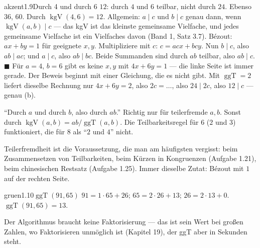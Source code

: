 \begin{loesungkarte}{akzent}{1.9}{Durch 4 und durch 6}
$12$: durch $4$ und $6$ teilbar, nicht durch $24$. Ebenso $36$, $60$.
Durch $\operatorname{kgV}(4, 6) = 12$. Allgemein: $a\mid c$ und $b\mid c$ genau dann, wenn $\operatorname{kgV}(a, b)\mid c$ --- das kgV ist das kleinste gemeinsame Vielfache, und jedes gemeinsame Vielfache ist ein Vielfaches davon (Band 1, Satz 3.7).
Bézout: $ax + by = 1$ für geeignete $x, y$. Multipliziere mit $c$: $c = acx + bcy$. Nun $b\mid c$, also $ab\mid ac$; und $a\mid c$, also $ab\mid bc$. Beide Summanden sind durch $ab$ teilbar, also $ab\mid c$. $\blacksquare$
Für $a = 4$, $b = 6$ gibt es keine $x, y$ mit $4x + 6y = 1$ --- die linke Seite ist immer gerade. Der Beweis beginnt mit einer Gleichung, die es nicht gibt. Mit $\operatorname{ggT} = 2$ liefert dieselbe Rechnung nur $4x + 6y = 2$, also $2c = \dots$, also $24\mid2c$, also $12\mid c$ --- genau (b).
\begin{fehler}\kastentext
\enquote{Durch $a$ und durch $b$, also durch $ab$.} Richtig nur für teilerfremde $a, b$. Sonst durch $\operatorname{kgV}(a, b) = ab/\operatorname{ggT}(a, b)$. Die Teilbarkeitsregel für $6$ ($2$ und $3$) funktioniert, die für $8$ als \enquote{$2$ und $4$} nicht.
\end{fehler}
\begin{mitnehmen}\kastentext
Teilerfremdheit ist die Voraussetzung, die man am häufigsten vergisst: beim Zusammensetzen von Teilbarkeiten, beim Kürzen in Kongruenzen (Aufgabe 1.21), beim chinesischen Restsatz (Aufgabe 1.25). Immer dieselbe Zutat: Bézout mit $1$ auf der rechten Seite.
\end{mitnehmen}
\end{loesungkarte}

\begin{loesungkarte}{gruen}{1.10}{$\operatorname{ggT}(91, 65)$}
$91 = 1\cdot65 + 26$; $65 = 2\cdot26 + 13$; $26 = 2\cdot13 + 0$. $\operatorname{ggT}(91, 65) = 13$.
\begin{mitnehmen}\kastentext
Der Algorithmus braucht keine Faktorisierung --- das ist sein Wert bei großen Zahlen, wo Faktorisieren unmöglich ist (Kapitel 19), der ggT aber in Sekunden steht.
\end{mitnehmen}
\end{loesungkarte}

